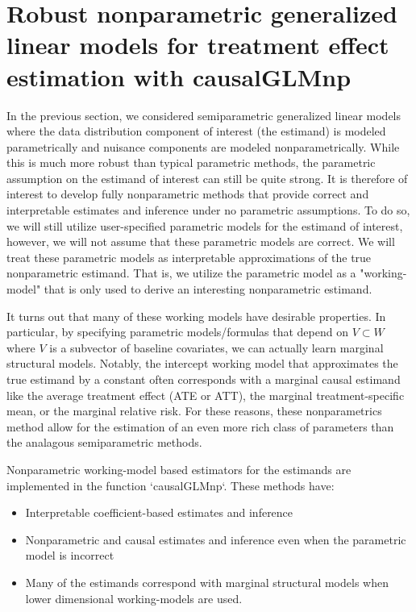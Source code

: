 \documentclass{article}
\begin{document}
\section{Robust nonparametric generalized linear models for treatment effect estimation  with causalGLMnp}
In the previous section, we considered semiparametric generalized linear models where the data distribution component of interest (the estimand) is modeled parametrically and nuisance components are modeled nonparametrically. While this is much more robust than typical parametric methods, the parametric assumption on the estimand of interest can still be quite strong. It is therefore of interest to develop fully nonparametric methods that provide correct and interpretable estimates and inference under no parametric assumptions. To do so, we will still utilize user-specified parametric models for the estimand of interest, however, we will not assume that these parametric models are correct. We will treat these parametric models as interpretable approximations of the true nonparametric estimand. That is, we utilize the parametric model as a "working-model" that is only used to derive an interesting nonparametric estimand.

It turns out that many of these working models have desirable properties. In particular, by specifying parametric models/formulas that depend on $V \subset W$ where $V$ is a subvector of baseline covariates, we can actually learn marginal structural models. Notably, the intercept working model that approximates the true estimand by a constant often corresponds with a marginal causal estimand like the average treatment effect (ATE or ATT), the marginal treatment-specific mean, or the marginal relative risk. For these reasons, these nonparametrics method allow for the estimation of an even more rich class of parameters than the analagous semiparametric methods.

Nonparametric working-model based estimators for the estimands are implemented in the function `causalGLMnp`. These methods have:

\begin{itemize}
\item Interpretable coefficient-based estimates and inference
\item Nonparametric and causal estimates and inference even when the parametric model is incorrect
\item Many of the estimands correspond with marginal structural models when lower dimensional working-models are used.
\end{itemize}
\end{document}
